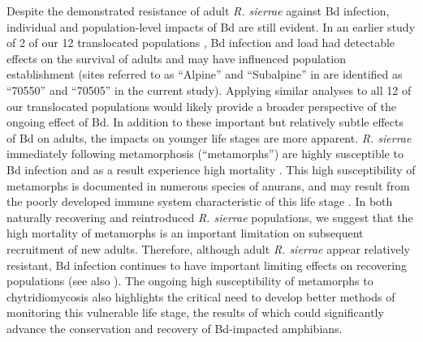\documentclass[
  letterpaper,
  DIV=11,
  numbers=noendperiod]{scrartcl}
\begin{document}
Despite the demonstrated resistance of adult \emph{R. sierrae} against
Bd infection, individual and population-level impacts of Bd are still
evident. In an earlier study of 2 of our 12 translocated populations
\citep{joseph2018}, Bd infection and load had detectable effects on the
survival of adults and may have influenced population establishment
(sites referred to as ``Alpine'' and ``Subalpine'' in \citet{joseph2018}
are identified as ``70550'' and ``70505'' in the current study).
Applying similar analyses to all 12 of our translocated populations
would likely provide a broader perspective of the ongoing effect of Bd.
In addition to these important but relatively subtle effects of Bd on
adults, the impacts on younger life stages are more apparent. \emph{R.
sierrae} immediately following metamorphosis (``metamorphs'') are highly
susceptible to Bd infection \citep{ellison2019} and as a result
experience high mortality \citep{rachowicz2006}. This high
susceptibility of metamorphs is documented in numerous species of
anurans, and may result from the poorly developed immune system
characteristic of this life stage \citep{humphries2022}. In both
naturally recovering and reintroduced \emph{R. sierrae} populations, we
suggest that the high mortality of metamorphs is an important limitation
on subsequent recruitment of new adults. Therefore, although adult
\emph{R. sierrae} appear relatively resistant, Bd infection continues to
have important limiting effects on recovering populations (see also
\citep{hollanders2022}). The ongoing high susceptibility of metamorphs
to chytridiomycosis also highlights the critical need to develop better
methods of monitoring this vulnerable life stage, the results of which
could significantly advance the conservation and recovery of Bd-impacted
amphibians.
\end{document}
